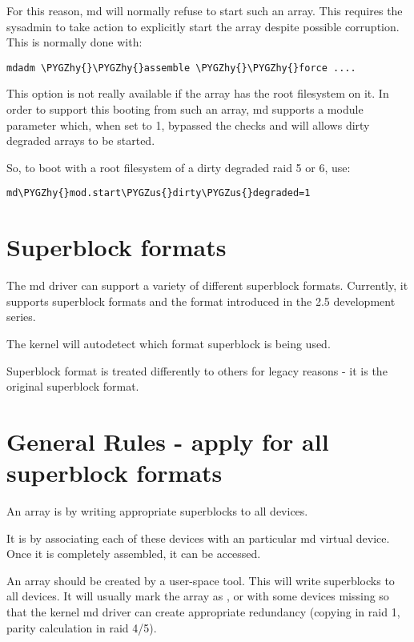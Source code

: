 \documentclass[a4paper,8pt,english]{sphinxmanual}
\def\PYGZus{\char`\_}
\def\PYGZhy{\char`\-}
\begin{document}
For this reason, md will normally refuse to start such an array.  This
requires the sysadmin to take action to explicitly start the array
despite possible corruption.  This is normally done with:

\begin{Verbatim}[commandchars=\\\{\}]
mdadm \PYGZhy{}\PYGZhy{}assemble \PYGZhy{}\PYGZhy{}force ....
\end{Verbatim}

This option is not really available if the array has the root
filesystem on it.  In order to support this booting from such an
array, md supports a module parameter  which,
when set to 1, bypassed the checks and will allows dirty degraded
arrays to be started.

So, to boot with a root filesystem of a dirty degraded raid 5 or 6, use:

\begin{Verbatim}[commandchars=\\\{\}]
md\PYGZhy{}mod.start\PYGZus{}dirty\PYGZus{}degraded=1
\end{Verbatim}


\section{Superblock formats}
\label{admin-guide/md:superblock-formats}
The md driver can support a variety of different superblock formats.
Currently, it supports superblock formats  and the  format
introduced in the 2.5 development series.

The kernel will autodetect which format superblock is being used.

Superblock format  is treated differently to others for legacy
reasons - it is the original superblock format.


\section{General Rules - apply for all superblock formats}
\label{admin-guide/md:general-rules-apply-for-all-superblock-formats}
An array is  by writing appropriate superblocks to all
devices.

It is  by associating each of these devices with an
particular md virtual device.  Once it is completely assembled, it can
be accessed.

An array should be created by a user-space tool.  This will write
superblocks to all devices.  It will usually mark the array as
, or with some devices missing so that the kernel md driver
can create appropriate redundancy (copying in raid 1, parity
calculation in raid 4/5).
\end{document}
